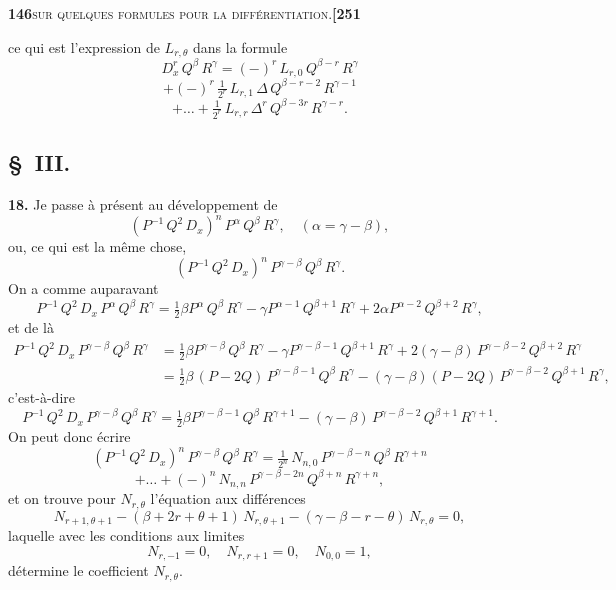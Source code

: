 \documentclass[11pt]{article}
\begin{document}
\newpage

\noindent\textbf{146}\hfill\textsc{sur quelques formules pour la différentiation.}\hfill\textbf{[251}

\medskip

\noindent ce qui est l'expression de $L_{r,\theta}$ dans la formule
\[
D_x^r\,Q^{\beta}\,R^{\gamma} = (-)^r\,L_{r,0}\,Q^{\beta-r}\,R^{\gamma}
\]
\[
+ (-)^r\,\tfrac{1}{2^r}\,L_{r,1}\,\Delta\,Q^{\beta-r-2}\,R^{\gamma-1}
\]
\[
+ \ldots + \tfrac{1}{2^r}\,L_{r,r}\,\Delta^{r}\,Q^{\beta-3r}\,R^{\gamma-r}.
\]

\subsection*{§~III.}

\textbf{18.} Je passe à présent au développement de
\[
(P^{-1}\,Q^2\,D_x)^n\,P^{\alpha}\,Q^{\beta}\,R^{\gamma},\quad (\alpha = \gamma - \beta),
\]
ou, ce qui est la même chose,
\[
(P^{-1}\,Q^2\,D_x)^n\,P^{\gamma-\beta}\,Q^{\beta}\,R^{\gamma}.
\]
On a comme auparavant
\[
P^{-1}\,Q^2\,D_x\,P^{\alpha}\,Q^{\beta}\,R^{\gamma} = \tfrac{1}{2}\beta P^{\alpha}\,Q^{\beta}\,R^{\gamma} - \gamma P^{\alpha-1}\,Q^{\beta+1}\,R^{\gamma} + 2\alpha P^{\alpha-2}\,Q^{\beta+2}\,R^{\gamma},
\]
et de là
\begin{align*}
P^{-1}\,Q^2\,D_x\,P^{\gamma-\beta}\,Q^{\beta}\,R^{\gamma} &= \tfrac{1}{2}\beta P^{\gamma-\beta}\,Q^{\beta}\,R^{\gamma} - \gamma P^{\gamma-\beta-1}\,Q^{\beta+1}\,R^{\gamma} + 2(\gamma-\beta)\,P^{\gamma-\beta-2}\,Q^{\beta+2}\,R^{\gamma}\\
&= \tfrac{1}{2}\beta\,(P - 2Q)\,P^{\gamma-\beta-1}\,Q^{\beta}\,R^{\gamma} - (\gamma - \beta)(P - 2Q)\,P^{\gamma-\beta-2}\,Q^{\beta+1}\,R^{\gamma},
\end{align*}
c'est-à-dire
\[
P^{-1}\,Q^2\,D_x\,P^{\gamma-\beta}\,Q^{\beta}\,R^{\gamma} = \tfrac{1}{2}\beta P^{\gamma-\beta-1}\,Q^{\beta}\,R^{\gamma+1} - (\gamma - \beta)\,P^{\gamma-\beta-2}\,Q^{\beta+1}\,R^{\gamma+1}.
\]
On peut donc écrire
\[
(P^{-1}\,Q^2\,D_x)^n\,P^{\gamma-\beta}\,Q^{\beta}\,R^{\gamma} = \tfrac{1}{2^n}\,N_{n,0}\,P^{\gamma-\beta-n}\,Q^{\beta}\,R^{\gamma+n}
\]
\[
+ \ldots + (-)^n\,N_{n,n}\,P^{\gamma-\beta-2n}\,Q^{\beta+n}\,R^{\gamma+n},
\]
et on trouve pour $N_{r,\theta}$ l'équation aux différences
\[
N_{r+1,\theta+1} - (\beta + 2r + \theta + 1)\,N_{r,\theta+1} - (\gamma - \beta - r - \theta)\,N_{r,\theta} = 0,
\]
laquelle avec les conditions aux limites
\[
N_{r,-1} = 0,\quad N_{r,r+1} = 0,\quad N_{0,0} = 1,
\]
détermine le coefficient $N_{r,\theta}$.
\end{document}
